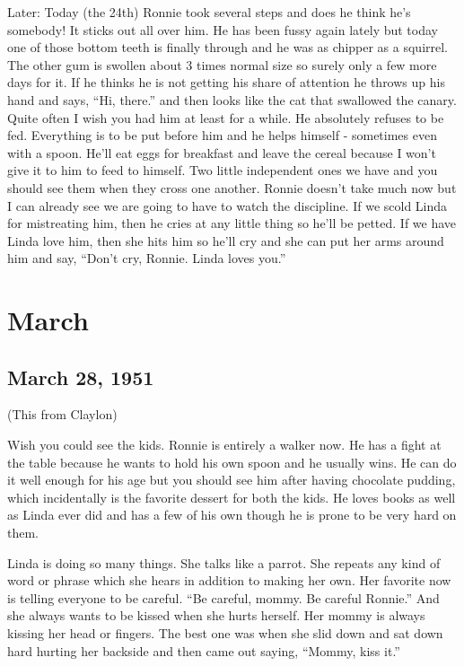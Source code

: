 \documentclass[
]{book}
\begin{document}
Later: Today (the 24th) Ronnie took several steps and does he think he's somebody! It sticks out all over him. He has been fussy again lately but today one of those bottom teeth is finally through and he was as chipper as a squirrel. The other gum is swollen about 3 times normal size so surely only a few more days for it. If he thinks he is not getting his share of attention he throws up his hand and says, ``Hi, there.'' and then looks like the cat that swallowed the canary. Quite often I wish you had him at least for a while. He absolutely refuses to be fed. Everything is to be put before him and he helps himself - sometimes even with a spoon. He'll eat eggs for breakfast and leave the cereal because I won't give it to him to feed to himself. Two little independent ones we have and you should see them when they cross one another. Ronnie doesn't take much now but I can already see we are going to have to watch the discipline. If we scold Linda for mistreating him, then he cries at any little thing so he'll be petted. If we have Linda love him, then she hits him so he'll cry and she can put her arms around him and say, ``Don't cry, Ronnie. Linda loves you.''

\hypertarget{march}{%
\section{March}\label{march}}

\hypertarget{march-28-1951}{%
\subsection{March 28, 1951}\label{march-28-1951}}

(This from Claylon)

Wish you could see the kids. Ronnie is entirely a walker now. He has a fight at the table because he wants to hold his own spoon and he usually wins. He can do it well enough for his age but you should see him after having chocolate pudding, which incidentally is the favorite dessert for both the kids. He loves books as well as Linda ever did and has a few of his own though he is prone to be very hard on them.

Linda is doing so many things. She talks like a parrot. She repeats any kind of word or phrase which she hears in addition to making her own. Her favorite now is telling everyone to be careful. ``Be careful, mommy. Be careful Ronnie.'' And she always wants to be kissed when she hurts herself. Her mommy is always kissing her head or fingers. The best one was when she slid down and sat down hard hurting her backside and then came out saying, ``Mommy, kiss it.''
\end{document}

